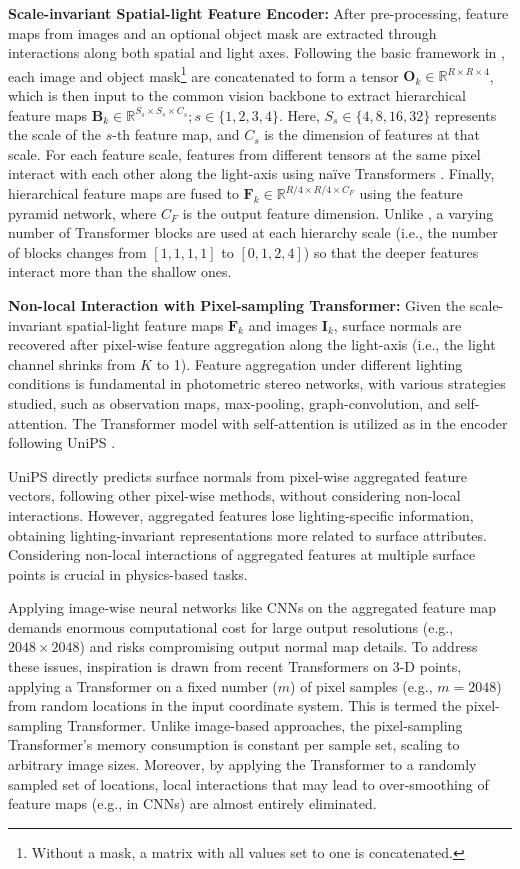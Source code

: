 \textbf{Scale-invariant Spatial-light Feature Encoder:} After pre-processing, feature maps from images and an optional object mask are extracted through interactions along both spatial and light axes. Following the basic framework in \cite{unips}, each image and object mask\footnote{Without a mask, a matrix with all values set to one is concatenated.} are concatenated to form a tensor $\mathbf{O}_k \in \mathbb{R}^{R \times R \times 4}$, which is then input to the common vision backbone to extract hierarchical feature maps $\mathbf{B}_k \in \mathbb{R}^{S_s \times S_s \times C_s}; s \in \{1, 2, 3, 4\}$. Here, $S_s \in \{4, 8, 16, 32\}$ represents the scale of the $s$-th feature map, and $C_s$ is the dimension of features at that scale. For each feature scale, features from different tensors at the same pixel interact with each other along the light-axis using naïve Transformers . Finally, hierarchical feature maps are fused to $\mathbf{F}_k \in \mathbb{R}^{R/4 \times R/4 \times C_F}$ using the feature pyramid network, where $C_F$ is the output feature dimension. Unlike \cite{unips}, a varying number of Transformer blocks are used at each hierarchy scale (i.e., the number of blocks changes from $[1, 1, 1, 1]$ to $[0, 1, 2, 4]$) so that the deeper features interact more than the shallow ones.

\textbf{Non-local Interaction with Pixel-sampling Transformer:} Given the scale-invariant spatial-light feature maps $\mathbf{F}_k$ and images $\mathbf{I}_k$, surface normals are recovered after pixel-wise feature aggregation along the light-axis (i.e., the light channel shrinks from $K$ to 1). Feature aggregation under different lighting conditions is fundamental in photometric stereo networks, with various strategies studied, such as observation maps, max-pooling, graph-convolution, and self-attention. The Transformer model with self-attention is utilized as in the encoder following UniPS \cite{unips}. 

UniPS directly predicts surface normals from pixel-wise aggregated feature vectors, following other pixel-wise methods, without considering non-local interactions. However, aggregated features lose lighting-specific information, obtaining lighting-invariant representations more related to surface attributes. Considering non-local interactions of aggregated features at multiple surface points is crucial in physics-based tasks.

Applying image-wise neural networks like CNNs on the aggregated feature map demands enormous computational cost for large output resolutions (e.g., $2048 \times 2048$) and risks compromising output normal map details. To address these issues, inspiration is drawn from recent Transformers on 3-D points, applying a Transformer on a fixed number ($m$) of pixel samples (e.g., $m = 2048$) from random locations in the input coordinate system. This is termed the pixel-sampling Transformer. Unlike image-based approaches, the pixel-sampling Transformer's memory consumption is constant per sample set, scaling to arbitrary image sizes. Moreover, by applying the Transformer to a randomly sampled set of locations, local interactions that may lead to over-smoothing of feature maps (e.g., in CNNs) are almost entirely eliminated.

